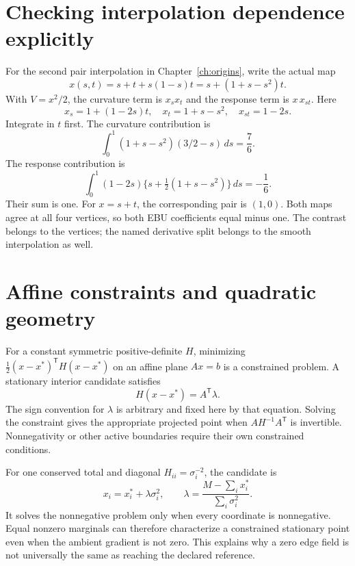 \section{Checking interpolation dependence explicitly}
For the second pair interpolation in Chapter~\ref{ch:origins}, write the actual map
\begin{equation}
 x(s,t)=s+t+s(1-s)t=s+(1+s-s^2)t.
\end{equation}
With $V=x^2/2$, the curvature term is $x_sx_t$ and the response term is $x\,x_{st}$. Here
\[
 x_s=1+(1-2s)t,\quad x_t=1+s-s^2,\quad x_{st}=1-2s.
\]
Integrate in $t$ first. The curvature contribution is
\begin{equation}
 \int_0^1(1+s-s^2)(3/2-s)\,ds=\frac76.
\end{equation}
The response contribution is
\begin{equation}
 \int_0^1(1-2s)\{s+\tfrac12(1+s-s^2)\}\,ds=-\frac16.
\end{equation}
Their sum is one. For $x=s+t$, the corresponding pair is $(1,0)$. Both maps agree at all four vertices, so both EBU coefficients equal minus one. The contrast belongs to the vertices; the named derivative split belongs to the smooth interpolation as well.

\section{Affine constraints and quadratic geometry}
For a constant symmetric positive-definite $H$, minimizing $\tfrac12(x-x^*)^{\mathsf T}H(x-x^*)$ on an affine plane $Ax=b$ is a constrained problem. A stationary interior candidate satisfies
\begin{equation}
 H(x-x^*)=A^{\mathsf T}\lambda.
\end{equation}
The sign convention for $\lambda$ is arbitrary and fixed here by that equation. Solving the constraint gives the appropriate projected point when $AH^{-1}A^{\mathsf T}$ is invertible. Nonnegativity or other active boundaries require their own constrained conditions.

For one conserved total and diagonal $H_{ii}=\sigma_i^{-2}$, the candidate is
\begin{equation}
 x_i=x_i^*+\lambda\sigma_i^2,\qquad
 \lambda=\frac{M-\sum_i x_i^*}{\sum_i\sigma_i^2}.
\end{equation}
It solves the nonnegative problem only when every coordinate is nonnegative. Equal nonzero marginals can therefore characterize a constrained stationary point even when the ambient gradient is not zero. This explains why a zero edge field is not universally the same as reaching the declared reference.
